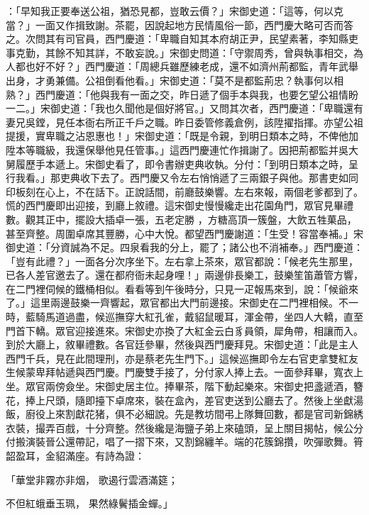 \begin{showcontents}{}
：「早知我正要奉送公祖，猶恐見都，豈敢云價？」宋御史道：「這等，何以克當？」一面又作揖致謝。茶罷，因說起地方民情風俗一節，西門慶大略可否而答之。次問其有司官員，西門慶道：「卑職自知其本府胡正尹，民望素著，李知縣吏事克勤，其餘不知其詳，不敢妄說。」宋御史問道：「守禦周秀，曾與執事相交，為人都也好不好？」西門慶道：「周總兵雖歷練老成，還不如濟州荊都監，青年武舉出身，才勇兼備。公祖倒看他看。」宋御史道：「莫不是都監荊忠？執事何以相熟？」西門慶道：「他與我有一面之交，昨日遞了個手本與我，也要乞望公祖情盼一二。」宋御史道：「我也久聞他是個好將官。」又問其次者，西門慶道：「卑職還有妻兄吳鏜，見任本衙右所正千戶之職。昨日委管修義倉例，該陞擢指揮。亦望公祖提援，實卑職之沾恩惠也！」宋御史道：「既是令親，到明日類本之時，不俾他加陞本等職級，我還保舉他見任管事。」這西門慶連忙作揖謝了。因把荊都監并吳大舅履歷手本遞上。宋御史看了，即令書辦吏典收執。分付：「到明日類本之時，呈行我看。」那吏典收下去了。西門慶又令左右悄悄遞了三兩銀子與他。那書吏如同印板刻在心上，不在話下。正說話間，前廳鼓樂響。左右來報，兩個老爹都到了。慌的西門慶即出迎接，到廳上敘禮。這宋御史慢慢纔走出花園角門，眾官見畢禮數。觀其正中，擺設大插卓一張，五老定勝 ，方糖高頂一簇盤，大飲五牲菓品，甚至齊整。周圍卓席其豐勝，心中大悅。都望西門慶謝道：「生受！容當奉補。」宋御史道：「分資誠為不足。四泉看我的分上，罷了；諸公也不消補奉。」西門慶道：「豈有此禮？」一面各分次序坐下。左右拿上茶來，眾官都說：「候老先生那里，已各人差官邀去了。還在都府衙未起身哩！」兩邊俳長樂工，鼓樂笙笛蕭管方響，在二門裡伺候的鐵桶相似。看看等到午後時分，只見一疋報馬來到，說：「候爺來了。」這里兩邊鼓樂一齊響起，眾官都出大門前邊接。宋御史在二門裡相候。不一時，藍騎馬道過盡，候巡撫穿大紅孔雀，戴貂鼠暖耳，渾金帶，坐四人大轎，直至門首下轎。眾官迎接進來。宋御史亦換了大紅金云白豸員領，犀角帶，相讓而入。到於大廳上，敘畢禮數。各官廷參畢，然後與西門慶拜見。宋御史道：「此是主人西門千兵，見在此間理刑，亦是蔡老先生門下。」這候巡撫即令左右官吏拿雙紅友生候蒙卑拜帖遞與西門慶。門慶雙手接了，分付家人捧上去。一面參拜畢，寬衣上坐。眾官兩傍僉坐。宋御史居主位。捧畢茶，階下動起樂來。宋御史把盞遞酒，簪花，捧上尺頭，隨即擡下卓席來，裝在盒內，差官吏送到公廳去了。然後上坐獻湯飯，廚役上來割獻花猪，俱不必細說。先是教坊間弔上隊舞回數，都是官司新錦綉衣裝，撮弄百戲，十分齊整。然後纔是海鹽子弟上來磕頭，呈上關目揭帖，候公分付搬演裝晉公還帶記，唱了一摺下來，又割錦纏羊。端的花簇錦攢，吹彈歌舞。筲韶盈耳，金貂滿座。有詩為證：

「華堂非霧亦非烟，  歌遏行雲酒滿筵；

不但紅蛾垂玉珮，  果然綠鬢插金蟬。」


\end{showcontents}
